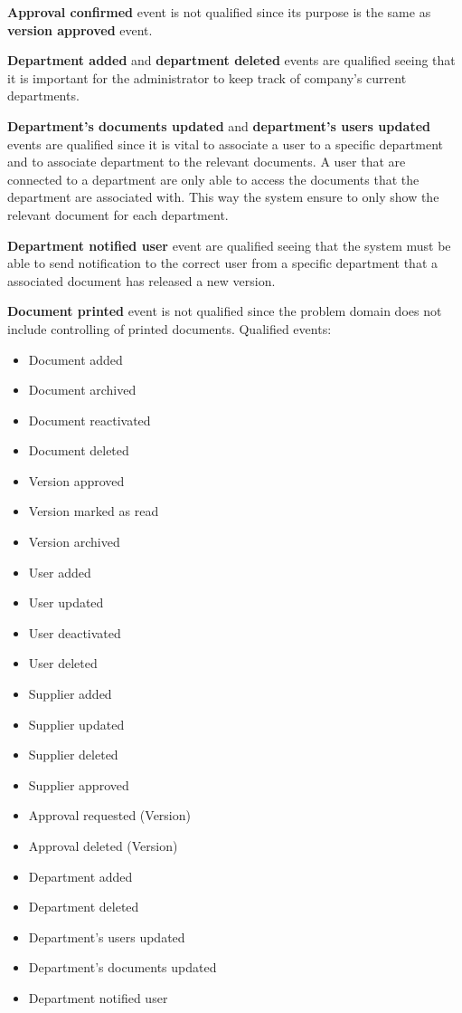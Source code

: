 \textbf{Approval confirmed} event is not qualified since its purpose is the same as \textbf{version approved} event.

\textbf{Department added} and \textbf{department deleted} events are qualified seeing that it is important for the administrator to keep track of company's current departments. 

\textbf{Department's documents updated} and \textbf{department's users updated} events are qualified since it is vital to associate a user to a specific department and to associate department to the relevant documents. A user that are connected to a department are only able to access the documents that the department are associated with. This way the system ensure to only show the relevant document for each department. 

\textbf{Department notified user} event are qualified seeing that the system must be able to send notification to the correct user from a specific department that a associated document has released a new version. 

\textbf{Document printed} event is not qualified since the problem domain does not include controlling of printed documents.
\newpage
Qualified events:
\begin{itemize} 
	\item Document added
	\item Document archived
	\item Document reactivated
	\item Document deleted
	\item Version approved
	\item Version marked as read
	\item Version archived
	\item User added
	\item User updated
	\item User deactivated
	\item User deleted
	\item Supplier added
	\item Supplier updated
	\item Supplier deleted
	\item Supplier approved
	\item Approval requested (Version)
	\item Approval deleted (Version)
	\item Department added
	\item Department deleted
	\item Department's users updated
	\item Department's documents updated
	\item Department notified user
\end{itemize}

